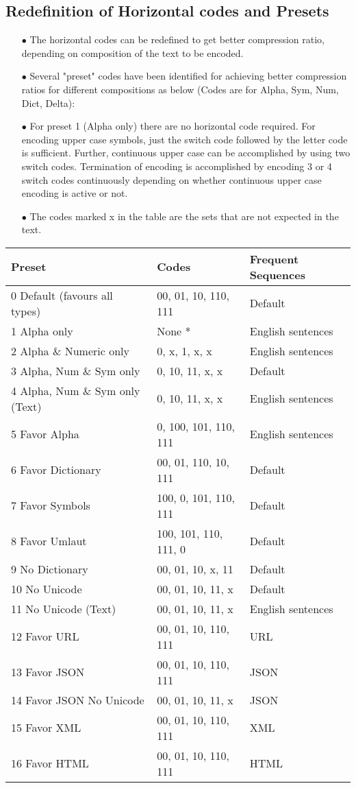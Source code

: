 \documentclass[]{article}
\begin{document}
	\subsection{Redefinition of Horizontal codes and Presets}
	\begin{itemize}
		\item[$\bullet$] The horizontal codes can be redefined to get better compression ratio, depending on composition of the text to be encoded.
		\item[$\bullet$] Several "preset" codes have been identified for achieving better compression ratios for different compositions as below (Codes are for Alpha, Sym, Num, Dict, Delta):
		\item[$\bullet$] For preset 1 (Alpha only) there are no horizontal code required. For encoding upper case symbols, just the switch code followed by the letter code is sufficient. Further, continuous upper case can be accomplished by using two switch codes. Termination of encoding is accomplished by encoding 3 or 4 switch codes continuously depending on whether continuous upper case encoding is active or not.
		\item[$\bullet$] The codes marked x in the table are the sets that are not expected in the text.
	\end{itemize}
	\begin{tabular}{ | l | l | l |} \hline
		﻿\textbf{Preset} & ﻿\textbf{Codes} & \textbf{Frequent Sequences} \\ \hline
		0 Default (favours all types) & 00, 01, 10, 110, 111 & Default \\ \hline
		1 Alpha only & None * & English sentences \\ \hline
		2 Alpha \& Numeric only & 0, x, 1, x, x & English sentences \\ \hline
		3 Alpha, Num \& Sym only & 0, 10, 11, x, x & Default \\ \hline
		4 Alpha, Num \& Sym only (Text) & 0, 10, 11, x, x & English sentences \\ \hline
		5 Favor Alpha & 0, 100, 101, 110, 111 & English sentences \\ \hline
		6 Favor Dictionary & 00, 01, 110, 10, 111 & Default \\ \hline
		7 Favor Symbols & 100, 0, 101, 110, 111 & Default \\ \hline
		8 Favor Umlaut & 100, 101, 110, 111, 0 & Default \\ \hline
		9 No Dictionary & 00, 01, 10, x, 11 & Default \\ \hline
		10 No Unicode & 00, 01, 10, 11, x & Default \\ \hline
		11 No Unicode (Text) & 00, 01, 10, 11, x & English sentences \\ \hline
		12 Favor URL & 00, 01, 10, 110, 111 & URL \\ \hline
		13 Favor JSON & 00, 01, 10, 110, 111 & JSON \\ \hline
		14 Favor JSON No Unicode & 00, 01, 10, 11, x & JSON \\ \hline
		15 Favor XML & 00, 01, 10, 110, 111 & XML \\ \hline
		16 Favor HTML & 00, 01, 10, 110, 111 & HTML \\ \hline
	\end{tabular}
	
\end{document}
